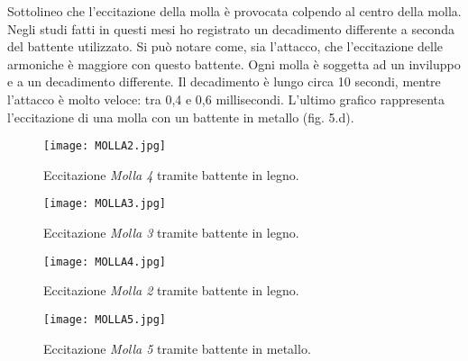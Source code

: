 Sottolineo che l'eccitazione della molla è provocata colpendo al centro della molla. 
Negli studi fatti in questi mesi ho registrato un decadimento differente a seconda del battente utilizzato.
Si può notare come, sia l'attacco, che l'eccitazione delle armoniche è maggiore con questo battente. Ogni molla è soggetta ad un inviluppo e a un decadimento differente. Il decadimento è lungo circa 10 secondi, mentre l'attacco è molto veloce: tra 0,4 e 0,6 millisecondi. 
L'ultimo grafico rappresenta l'eccitazione di una molla con un battente in metallo (fig. 5.d). 

\begin{figure}[htbp]
\begin{center}
\texttt{[image: MOLLA2.jpg]}
\caption{Eccitazione \textit{Molla 4} tramite battente in legno.}
\label{default}
\end{center}
\end{figure}

\begin{figure}[htbp]
\begin{center}
\texttt{[image: MOLLA3.jpg]}
\caption{Eccitazione \textit{Molla 3} tramite battente in legno.}
\label{default}
\end{center}
\end{figure}

\begin{figure}[htbp]
\begin{center}
\texttt{[image: MOLLA4.jpg]}
\caption{Eccitazione \textit{Molla 2} tramite battente in legno.}
\label{default}
\end{center}
\end{figure}
%
%
%
\begin{figure}[htbp]
\begin{center}
\texttt{[image: MOLLA5.jpg]}
\caption{Eccitazione \textit{Molla 5} tramite battente in metallo.}
\label{default}
\end{center}
\end{figure}

